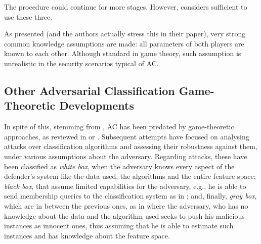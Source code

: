 %
The procedure could continue for more stages.
However, \parencite{adversarialClassification2004} considers sufficient to use these three.


As presented (and the authors actually stress this
in their paper), very strong common knowledge assumptions are made: all parameters of both players are known to each other. Although standard in game theory, such  assumption is unrealistic in the security scenarios  
typical of AC.




\subsection{Other Adversarial Classification Game-Theoretic Developments}\label{sec:other_AC}

In spite of this, stemming from 
\parencite{adversarialClassification2004}, AC has been predated by game-theoretic approaches, as reviewed in \parencite{biggio2014security} or \parencite{li2014feature}.
Subsequent attempts have focused on analysing attacks over classification algorithms and assessing their robustness against them, %
under various assumptions about the adversary. Regarding attacks, these have been classified as {\em white box}, when
the adversary knows every aspect of the defender's system
like the data used, the algorithms and the entire feature space; 
{\em black box}, that assume limited capabilities for the adversary, e.g., he is able to send membership queries to the classification system as in
\parencite{adversarialLearning2005}; and, finally,
{\em gray box}, which are in between the previous ones, as in \parencite{zhou2012adversarial}
where the adversary, who has no knowledge about the data and the algorithm used
seeks to push his malicious instances
as innocent 
ones, thus assuming that he is able to estimate such instances and has knowledge about the feature space. 

